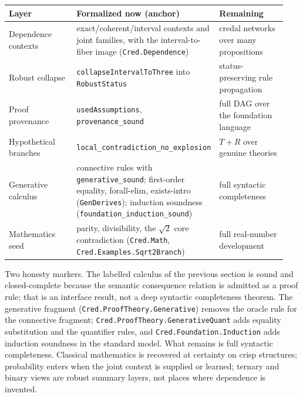 \documentclass[11pt,a4paper]{article}
\newcommand{\Lean}[1]{\texttt{#1}}
\begin{document}
\begin{center}
\begin{tabular}{@{}p{0.27\linewidth}p{0.40\linewidth}p{0.27\linewidth}@{}}
\toprule
Layer & Formalized now (anchor) & Remaining \\
\midrule
Dependence contexts &
exact/coherent/interval contexts and joint families, with the
interval-to-fiber image (\Lean{Cred.Dependence}) &
credal networks over many propositions \\[2pt]
Robust collapse &
\Lean{collapseIntervalToThree} into \Lean{RobustStatus} &
status-preserving rule propagation \\[2pt]
Proof provenance &
\Lean{usedAssumptions}, \Lean{provenance\_sound} &
full DAG over the foundation language \\[2pt]
Hypothetical branches &
\Lean{local\_contradiction\_no\_explosion} &
$T+R$ over genuine theories \\[2pt]
Generative calculus &
connective rules with \Lean{generative\_sound}; first-order equality,
forall-elim, exists-intro (\Lean{GenDerives}); induction soundness
(\Lean{foundation\_induction\_sound}) &
full syntactic completeness \\[2pt]
Mathematics seed &
parity, divisibility, the $\sqrt2$ core contradiction
(\Lean{Cred.Math}, \Lean{Cred.Examples.Sqrt2Branch}) &
full real-number development \\
\bottomrule
\end{tabular}
\end{center}

Two honesty markers.  The labelled calculus of the previous section is
sound and closed-complete because the semantic consequence relation is
admitted as a proof rule; that is an interface result, not a deep
syntactic completeness theorem.  The generative fragment
(\Lean{Cred.ProofTheory.Generative}) removes the oracle rule for the
connective fragment; \Lean{Cred.ProofTheory.GenerativeQuant} adds equality
substitution and the quantifier rules, and \Lean{Cred.Foundation.Induction}
adds induction soundness in the standard model.  What remains is full
syntactic completeness.  Classical mathematics is recovered at certainty on
crisp structures; probability enters when the joint context is supplied or
learned; ternary and binary views are robust summary layers, not places
where dependence is invented.
\end{document}
